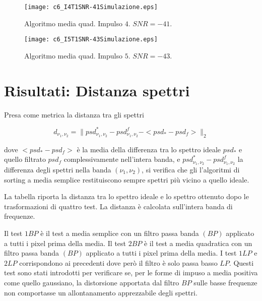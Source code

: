\begin{figure}[tbp] 
\centering    
\texttt{[image: c6\_I4T1SNR-41Simulazione.eps]}
\caption[Algoritmo media semplice. Impulso $4$. $SNR=-41$.]
{Algoritmo media quad. Impulso $4$. $SNR=-41$.}
\label{fig:c6_I4T1SNR-41Simulazione}
\end{figure}


\begin{figure}[tbp] 
\centering    
\texttt{[image: c6\_I5T1SNR-43Simulazione.eps]}
\caption[Algoritmo media semplice. Impulso $5$. $SNR=-43$.]
{Algoritmo media quad. Impulso $5$. $SNR=-43$.}
\label{fig:c6_I5T1SNR-43Simulazione}
\end{figure}


\pagebreak




\section{Risultati: Distanza spettri}

Presa come metrica la distanza tra gli spettri

\begin{equation}
 d_{\nu_{1},\nu_{2}} = \| psd_{\nu_{1},\nu_{2}}^{*} - psd_{\nu_{1},\nu_{2}}^{f} - <psd_{*} - psd_{f}> \|_{2}
\end{equation}
\label{eqn:metrica}

dove $<psd_{*} - psd_{f}>$ è la media della differenza tra lo spettro ideale $psd_{*}$ e quello filtrato $psd_{f}$ complessivamente nell'intera banda, e $psd_{\nu_{1},\nu_{2}}^{*} - psd_{\nu_{1},\nu_{2}}^{f}$ la differenza degli spettri nella banda $(\nu_{1},\nu_{2})$, si verifica che gli l'algoritmi di sorting a media semplice restituiscono sempre spettri più vicino a quello ideale.


La tabella riporta la distanza tra lo spettro ideale e lo spettro ottenuto dopo le trasformazioni di quattro test. La distanza è calcolata sull'intera banda di frequenze.

Il test $1BP$ è il test a media semplice con un filtro passa banda $(BP)$ applicato a tutti i pixel prima della media.
Il test $2BP$ è il test a media quadratica con un filtro passa banda $(BP)$ applicato a tutti i pixel prima della media.
I test $1LP$ e $2LP$ corrispondono ai precedenti dove però il filtro è solo passa basso $LP$. Questi test sono stati introdotti per verificare se, per le forme di impuso a media positiva come quello gaussiano, la distorsione apportata dal filtro $BP$ sulle basse frequenze non comportasse un allontanamento apprezzabile degli spettri.

